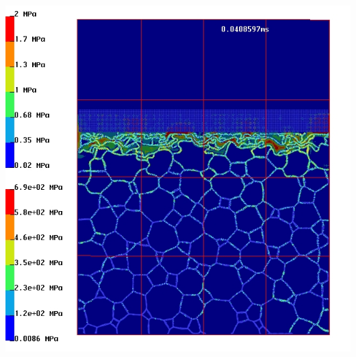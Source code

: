 \documentclass{beamer}
\begin{document}
\begin{frame}
{                      \hspace{12pt}
                      \includegraphics{FIGS/foamCrush40mm_v1_g_200ms_03.jpg}}\\
      \vspace{12pt}
\end{frame}
\end{document}
